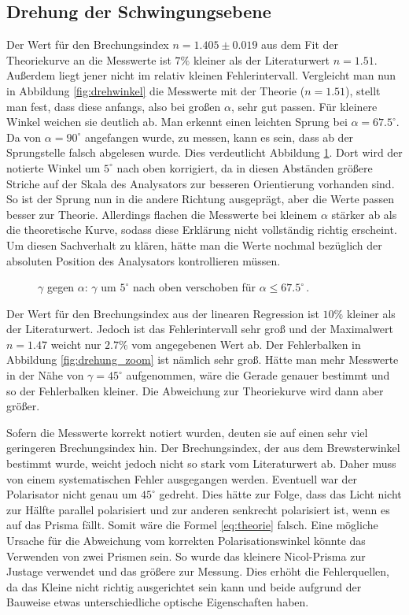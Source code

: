 \documentclass[12pt,a4paper,titlepage,headinclude,bibtotoc]{scrartcl}
\begin{document}
\subsection{Drehung der Schwingungsebene}
Der Wert für den Brechungsindex $n=1.405 \pm 0.019$ aus dem Fit der Theoriekurve an die Messwerte ist $7\%$ kleiner als der Literaturwert $n=1.51$.
Außerdem  liegt jener nicht im relativ kleinen Fehlerintervall.
Vergleicht man nun in Abbildung \ref{fig:drehwinkel} die Messwerte mit der Theorie ($n=1.51$), stellt man fest, dass diese anfangs, also bei großen $\alpha$, sehr gut passen.
Für kleinere Winkel weichen sie deutlich ab.
Man erkennt einen leichten Sprung bei $\alpha=67.5^\circ$.
Da von $\alpha=90^\circ$ angefangen wurde, zu messen, kann es sein, dass ab der Sprungstelle falsch abgelesen wurde.
Dies verdeutlicht Abbildung \ref{fig:drehung2}.
Dort wird der notierte Winkel um $5^\circ$ nach oben korrigiert, da in diesen Abständen größere Striche auf der Skala des Analysators zur besseren Orientierung vorhanden sind.
So ist der Sprung nun in die andere Richtung ausgeprägt, aber die Werte passen besser zur Theorie.
Allerdings flachen die Messwerte bei kleinem $\alpha$ stärker ab als die theoretische Kurve, sodass diese Erklärung nicht vollständig richtig erscheint.
Um diesen Sachverhalt zu klären, hätte man die Werte nochmal bezüglich der absoluten Position des Analysators kontrollieren müssen.
\begin{figure}[!htb]
	\centering
	
	\caption{$\gamma$ gegen $\alpha$: $\gamma$ um $5^\circ$ nach oben verschoben für $\alpha \leq 67.5^\circ\,$.}
	\label{fig:drehung2}
\end{figure}

Der Wert für den Brechungsindex aus der linearen Regression ist $10\%$ kleiner als der Literaturwert.
Jedoch ist das Fehlerintervall sehr groß und der Maximalwert $n=1.47$ weicht nur $2.7\%$ vom angegebenen Wert ab.
Der Fehlerbalken in Abbildung \ref{fig:drehung_zoom} ist nämlich sehr groß.
Hätte man mehr Messwerte in der Nähe von $\gamma=45^\circ$ aufgenommen, wäre die Gerade genauer bestimmt und so der Fehlerbalken kleiner.
Die Abweichung zur Theoriekurve wird dann aber größer.

Sofern die Messwerte korrekt notiert wurden, deuten sie auf einen sehr viel geringeren Brechungsindex hin.
Der Brechungsindex, der aus dem Brewsterwinkel bestimmt wurde, weicht jedoch nicht so stark vom Literaturwert ab.
Daher muss von einem systematischen Fehler ausgegangen werden.
Eventuell war der Polarisator nicht genau um $45^\circ$ gedreht.
Dies hätte zur Folge, dass das Licht nicht zur Hälfte parallel polarisiert und zur anderen senkrecht polarisiert ist, wenn es auf das Prisma fällt.
Somit wäre die Formel \eqref{eq:theorie} falsch.
Eine mögliche Ursache für die Abweichung vom korrekten Polarisationswinkel könnte das Verwenden von zwei Prismen sein.
So wurde das kleinere Nicol-Prisma zur Justage verwendet und das größere zur Messung.
Dies erhöht die Fehlerquellen, da das Kleine nicht richtig ausgerichtet sein kann und beide aufgrund der Bauweise etwas unterschiedliche optische Eigenschaften haben.
\end{document}
